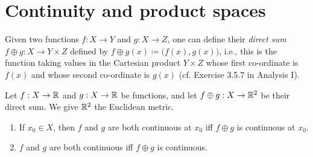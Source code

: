 \section{Continuity and product spaces}\label{ii:sec:2.2}

\begin{note}
  Given two functions \(f : X \to Y\) and \(g : X \to Z\), one can define their \emph{direct sum} \(f \oplus g : X \to Y \times Z\) defined by \(f \oplus g(x) \coloneqq \big(f(x), g(x)\big)\), i.e., this is the function taking values in the Cartesian product \(Y \times Z\) whose first co-ordinate is \(f(x)\) and whose second co-ordinate is \(g(x)\)
  (cf. Exercise 3.5.7 in Analysis I).
\end{note}

\begin{lem}\label{ii:2.2.1}
  Let \(f : X \to \mathbb{R}\) and \(g : X \to \mathbb{R}\) be functions, and let \(f \oplus g : X \to \mathbb{R}^2\) be their direct sum.
  We give \(\mathbb{R}^2\) the Euclidean metric.
  \begin{enumerate}
    \item\label{ii:2.2.1.a} If \(x_0 \in X\), then \(f\) and \(g\) are both continuous at \(x_0\) iff \(f \oplus g\) is continuous at \(x_0\).
    \item\label{ii:2.2.1.b} \(f\) and \(g\) are both continuous iff \(f \oplus g\) is continuous.
  \end{enumerate}
\end{lem}

